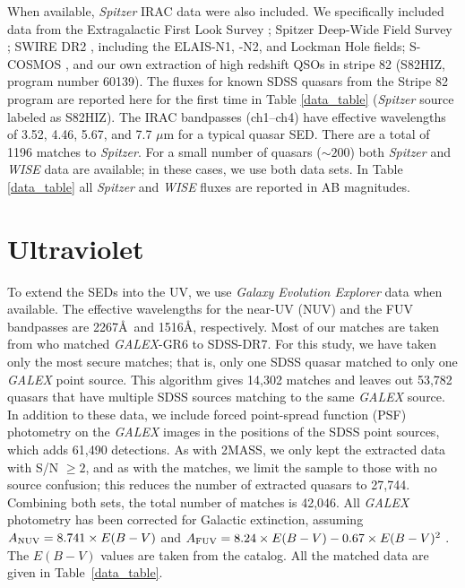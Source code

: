 When available, {\em Spitzer} IRAC data were also included.  We specifically included data from the Extragalactic First Look Survey \citep[XFLS;][]{Lacy:2005}; Spitzer  Deep-Wide Field Survey \citep[SDWFS;][]{Ashby:2009}; SWIRE DR2 \citep{Lonsdale:2003}, including the ELAIS-N1, -N2, and Lockman Hole fields; S-COSMOS \citep{Sanders:2007}, and our own extraction of high redshift QSOs in stripe 82 (S82HIZ, program number 60139).  The fluxes for known SDSS quasars from the Stripe 82 program are reported here for the first time in Table \ref{data_table} ({\em Spitzer} source labeled as S82HIZ).  The IRAC bandpasses (ch1--ch4) have effective wavelengths of 3.52, 4.46, 5.67, and 7.7 $\mu$m for a typical quasar SED.  There are a total of 1196 matches to {\em Spitzer}.  For a small number of quasars ($\sim200$) both {\em Spitzer} and {\em WISE} data are available; in these cases, we use both data sets.  In Table \ref{data_table} all {\em Spitzer} and {\em WISE} fluxes are reported in AB magnitudes.

\section{Ultraviolet}

To extend the SEDs into the UV, we use {\em Galaxy Evolution Explorer} \citep[{\em GALEX}; ][]{Martin:2005} data when available.  The effective wavelengths for the near-UV (NUV) and the FUV bandpasses are 2267\AA\ and 1516\AA, respectively. Most of our matches are taken from \citet{Budavari:2009} who matched {\em GALEX}-GR6 to SDSS-DR7.  For this study, we have taken only the most secure matches; that is, only one SDSS quasar matched to only one {\em GALEX} point source.  This algorithm gives 14,302 matches and leaves out 53,782 quasars that have multiple SDSS sources matching to the same {\em GALEX} source.  In addition to these data, we include forced point-spread function (PSF) photometry \citep{Bovy:2011,Bovy:2012} on the {\em GALEX} images in the positions of the SDSS point sources, which adds 61,490 detections.  As with 2MASS, we only kept the extracted data with S/N $\geq 2$, and as with the \citet{Budavari:2009} matches, we limit the sample to those with no source confusion; this reduces the number of extracted quasars to 27,744.  Combining both sets, the total number of matches is 42,046.  All {\em GALEX} photometry has been corrected for Galactic extinction, assuming $A_{{\rm NUV}}= 8.741\times E(B-V)$ and $A_{{\rm FUV}}= 8.24\times E(B-V)-0.67\times E(B-V)^2$ \citep{Wyder:2007}.  The $E(B-V)$ values are taken from the \citet{Schneider:2010} catalog.  All the matched data are given in Table~\ref{data_table}.

